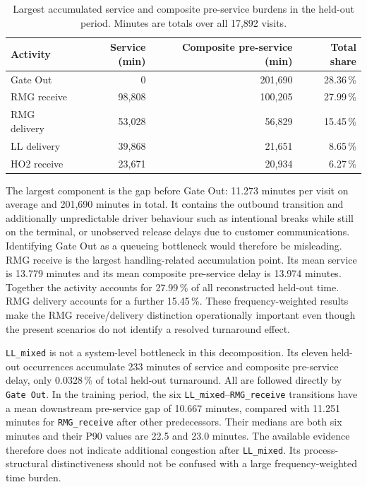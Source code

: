 \begin{table}[htbp]
\centering
\setlength{\tabcolsep}{4pt}
\begin{tabular}{L{3.2cm}rrr}
\toprule
\textbf{Activity} & \textbf{Service (min)} &
\textbf{Composite pre-service (min)} & \textbf{Total share} \\
\midrule
Gate Out     & 0      & 201,690 & 28.36\,\% \\
RMG receive  & 98,808 & 100,205 & 27.99\,\% \\
RMG delivery & 53,028 & 56,829  & 15.45\,\% \\
LL delivery  & 39,868 & 21,651  & 8.65\,\% \\
HO2 receive  & 23,671 & 20,934  & 6.27\,\% \\
\bottomrule
\end{tabular}
\caption{Largest accumulated service and composite pre-service burdens in the
held-out period. Minutes are totals over all 17,892 visits.}
\label{tab:bottleneck_burden}
\end{table}

The largest component is the gap before Gate Out: 11.273 minutes per visit on
average and 201,690 minutes in total. It contains the outbound transition and additionally 
unpredictable driver behaviour such as intentional breaks while still on the
terminal, or unobserved release delays due to customer communications.
Identifying Gate Out as a queueing bottleneck would therefore be misleading. RMG receive is the largest handling-related accumulation
point. Its mean service is 13.779 minutes and its mean composite pre-service
delay is 13.974 minutes. Together the activity accounts for 27.99\,\% of all
reconstructed held-out time. RMG delivery accounts for a further 15.45\,\%.
These frequency-weighted results make the RMG receive/delivery distinction
operationally important even though the present scenarios do not identify a
resolved turnaround effect.

\texttt{LL\_mixed} is not a system-level bottleneck in this decomposition. Its
eleven held-out occurrences accumulate 233 minutes of service and composite
pre-service delay, only 0.0328\,\% of total held-out turnaround. All are followed
directly by \texttt{Gate Out}. In the training period, the six
\texttt{LL\_mixed}--\texttt{RMG\_receive} transitions have a mean downstream
pre-service gap of 10.667 minutes, compared with 11.251 minutes for
\texttt{RMG\_receive} after other predecessors. Their medians are both six
minutes and their P90 values are 22.5 and 23.0 minutes. The available evidence
therefore does not indicate additional congestion after \texttt{LL\_mixed}.
Its process-structural distinctiveness should not be confused with a large
frequency-weighted time burden.


